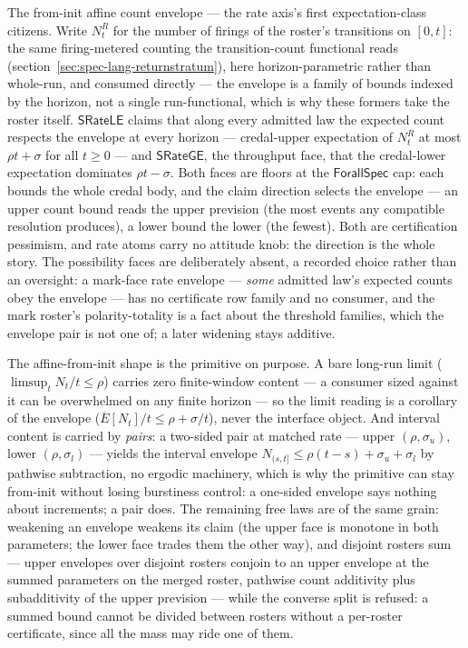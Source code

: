 The from-init affine count envelope --- the rate axis's first
expectation-class citizens. Write $N^R_t$ for the number of firings
of the roster's transitions on $[0, t]$: the same firing-metered
counting the transition-count functional reads
(section~\ref{sec:spec-lang-returnstratum}), here horizon-parametric
rather than whole-run, and consumed directly --- the envelope is a
family of bounds indexed by the horizon, not a single
run-functional, which is why these formers take the roster itself.
$\mathsf{SRateLE}$ claims that along every admitted law the expected
count respects the envelope at every horizon --- credal-upper
expectation of $N^R_t$ at most $\rho t + \sigma$ for all $t \ge 0$
--- and $\mathsf{SRateGE}$, the throughput face, that the
credal-lower expectation dominates $\rho t - \sigma$. Both faces are
floors at the $\mathsf{ForallSpec}$ cap: each bounds the whole
credal body, and the claim direction selects the envelope --- an
upper count bound reads the upper prevision (the most events any
compatible resolution produces), a lower bound the lower (the
fewest). Both are certification pessimism, and rate atoms carry no
attitude knob: the direction is the whole story. The possibility
faces are deliberately absent, a recorded choice rather than an
oversight: a mark-face rate envelope --- \emph{some} admitted law's
expected counts obey the envelope --- has no certificate row family
and no consumer, and the mark roster's polarity-totality is a fact
about the threshold families, which the envelope pair is not one
of; a later widening stays additive.

The affine-from-init shape is the primitive on purpose. A bare
long-run limit ($\limsup_t N_t/t \le \rho$) carries zero
finite-window content --- a consumer sized against it can be
overwhelmed on any finite horizon --- so the limit reading is a
corollary of the envelope
($\overline{E}[N_t]/t \le \rho + \sigma/t$), never the interface
object. And interval content is carried by \emph{pairs}: a
two-sided pair at matched rate --- upper $(\rho, \sigma_u)$, lower
$(\rho, \sigma_l)$ --- yields the interval envelope
$N_{(s,t]} \le \rho(t - s) + \sigma_u + \sigma_l$ by pathwise
subtraction, no ergodic machinery, which is why the primitive can
stay from-init without losing burstiness control: a one-sided
envelope says nothing about increments; a pair does. The remaining
free laws are of the same grain: weakening an envelope weakens its
claim (the upper face is monotone in both parameters; the lower
face trades them the other way), and disjoint rosters sum ---
upper envelopes over disjoint rosters conjoin to an upper envelope
at the summed parameters on the merged roster, pathwise count
additivity plus subadditivity of the upper prevision --- while the
converse split is refused: a summed bound cannot be divided
between rosters without a per-roster certificate, since all the
mass may ride one of them.


